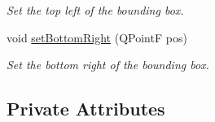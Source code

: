 \begin{DoxyCompactItemize}
\begin{DoxyCompactList}\small\item\em Set the top left of the bounding box. \end{DoxyCompactList}\item 
void \hyperlink{classKFPrediction_a25c7ec0647484098eb39df70bdb2e06c}{set\+Bottom\+Right} (Q\+PointF pos)\hypertarget{classKFPrediction_a25c7ec0647484098eb39df70bdb2e06c}{}\label{classKFPrediction_a25c7ec0647484098eb39df70bdb2e06c}

\begin{DoxyCompactList}\small\item\em Set the bottom right of the bounding box. \end{DoxyCompactList}\end{DoxyCompactItemize}
\subsection*{Private Attributes}
